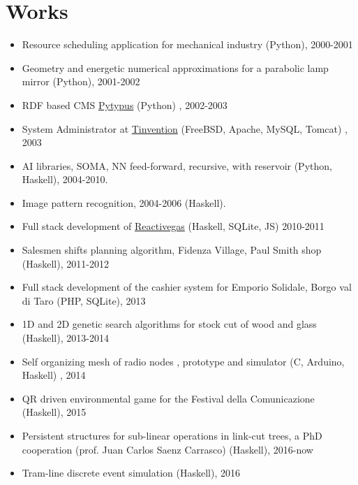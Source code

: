 \documentclass[letterpaper,11pt,oneside]{article}
\begin{document}
    \section*{Works}
        \begin{itemize}
            \item Resource scheduling application for mechanical industry (Python), 2000-2001 
            \item Geometry and energetic numerical approximations for a parabolic lamp mirror    (Python), 2001-2002 
            \item RDF based CMS \href{http://pytypus.cvs.sourceforge.net/viewvc/pytypus/}{Pytypus}  (Python) , 2002-2003 
            \item System Administrator at \href{http://tinvention.net}{Tinvention} (FreeBSD, Apache, MySQL, Tomcat) , 2003
            \item AI libraries, SOMA, NN feed-forward, recursive, with reservoir (Python, Haskell), 2004-2010. 
            \item Image pattern recognition, 2004-2006 (Haskell). 
            \item Full stack development of \href {https://lambdasistemi.net/reactivegas}{Reactivegas} (Haskell, SQLite, JS) 2010-2011 
            \item Salesmen shifts planning algorithm, Fidenza Village, Paul Smith shop (Haskell), 2011-2012 
            \item Full stack development of the cashier system for Emporio Solidale, Borgo val di Taro (PHP, SQLite), 2013 
            \item 1D and 2D genetic search algorithms for stock cut of wood and glass (Haskell), 2013-2014 
            \item Self organizing mesh of radio nodes , prototype and simulator (C, Arduino, Haskell) , 2014 
            \item QR driven environmental game for the Festival della Comunicazione (Haskell), 2015 
            \item Persistent structures for sub-linear operations in link-cut trees, a PhD cooperation (prof. Juan Carlos Saenz Carrasco) (Haskell), 2016-now  
            \item Tram-line discrete event simulation (Haskell), 2016 
        \end{itemize}
\end{document}
